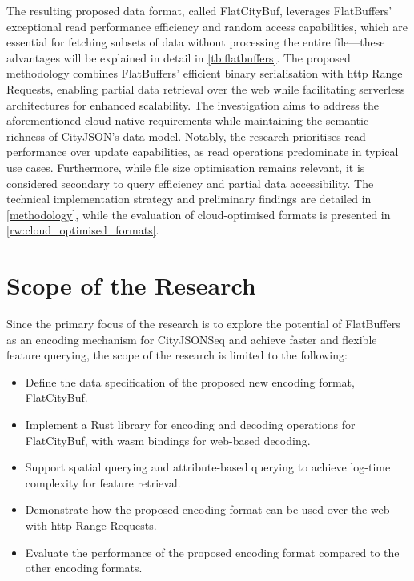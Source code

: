 The resulting proposed data format, called FlatCityBuf, leverages FlatBuffers' exceptional read performance efficiency and random access capabilities, which are essential for fetching subsets of data without processing the entire file—these advantages will be explained in detail in \autoref{tb:flatbuffers}.
The proposed methodology combines FlatBuffers' efficient binary serialisation with \ac{http} Range Requests, enabling partial data retrieval over the web while facilitating serverless architectures for enhanced scalability.
The investigation aims to address the aforementioned cloud-native requirements while maintaining the semantic richness of CityJSON's data model.
Notably, the research prioritises read performance over update capabilities, as read operations predominate in typical use cases.
Furthermore, while file size optimisation remains relevant, it is considered secondary to query efficiency and partial data accessibility.
The technical implementation strategy and preliminary findings are detailed in \autoref{methodology}, while the evaluation of cloud-optimised formats is presented in \autoref{rw:cloud_optimised_formats}.

\section{Scope of the Research}
\label{introduction:scope_of_the_research}

Since the primary focus of the research is to explore the potential of FlatBuffers as an encoding mechanism for CityJSONSeq and achieve faster and flexible feature querying, the scope of the research is limited to the following:

\begin{itemize}
  \item Define the data specification of the proposed new encoding format, FlatCityBuf.
  \item Implement a Rust library for encoding and decoding operations for FlatCityBuf, with \ac{wasm} bindings for web-based decoding.
  \item Support spatial querying and attribute-based querying to achieve log-time complexity for feature retrieval.
  \item Demonstrate how the proposed encoding format can be used over the web with \ac{http} Range Requests.
  \item Evaluate the performance of the proposed encoding format compared to the other encoding formats.
\end{itemize}

